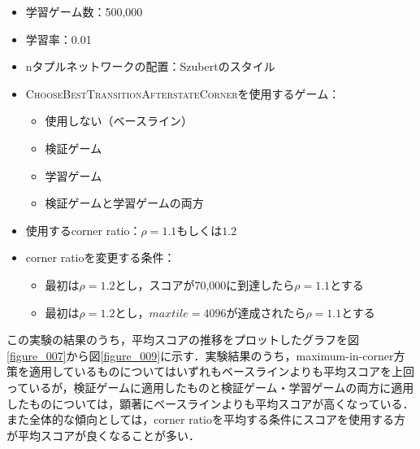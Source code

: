 \documentclass{suribt}
\begin{document}
\begin{itemize}
\item 学習ゲーム数：500,000
\item 学習率：0.01
\item nタプルネットワークの配置：Szubertのスタイル
\item \textsc{ChooseBestTransitionAfterstateCorner}を使用するゲーム：
\begin{itemize}
\item 使用しない（ベースライン）
\item 検証ゲーム
\item 学習ゲーム
\item 検証ゲームと学習ゲームの両方
\end{itemize}
\item 使用するcorner ratio：${\rho}=1.1 \text{もしくは} 1.2$
\item corner ratioを変更する条件：
\begin{itemize}
\item 最初は${\rho}=1.2$とし，スコアが70,000に到達したら${\rho}=1.1$とする
\item 最初は${\rho}=1.2$とし，$maxtile=4096$が達成されたら${\rho}=1.1$とする
\end{itemize}
\end{itemize}

この実験の結果のうち，平均スコアの推移をプロットしたグラフを図\ref{figure_007}から図\ref{figure_009}に示す．実験結果のうち，maximum-in-corner方策を適用しているものについてはいずれもベースラインよりも平均スコアを上回っているが，検証ゲームに適用したものと検証ゲーム・学習ゲームの両方に適用したものについては，顕著にベースラインよりも平均スコアが高くなっている．また全体的な傾向としては，corner ratioを平均する条件にスコアを使用する方が平均スコアが良くなることが多い．
\end{document}
